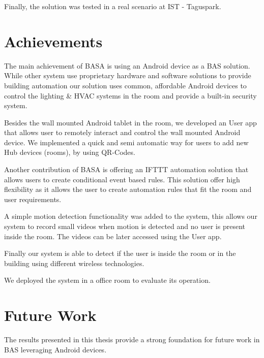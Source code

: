 Finally, the solution was tested in a real scenario  at \ac{IST} - Taguspark.


\section{Achievements}
\label{section:achievements}

The main achievement of BASA is using an Android device as a \ac{BAS} solution. While other system use proprietary hardware and software solutions to provide building automation our solution uses common, affordable Android devices to control the lighting \& \ac{HVAC} systems in the room and provide a built-in security system. 

Besides the wall mounted Android tablet in the room, we developed an User app that allows user to remotely interact and control the wall mounted Android device. We implemented a quick and semi automatic way for users to add new Hub devices (rooms), by using QR-Codes.


Another contribution of BASA is offering an \ac{IFTTT} automation solution that allows users to create conditional event based rules. This solution offer high flexibility as it allows the user to create automation rules that fit the room and user requirements.

A simple motion detection functionality was added to the system, this allows our system to record small videos when motion is detected and no user is present inside the room. The videos can be later accessed using the User app.

Finally our system is able to detect if the user is inside the room or in the building using different wireless technologies.


We deployed the system in a office room to evaluate its operation. 






\section{Future Work}
\label{section:future}

The results presented in this thesis provide a strong foundation for future work in \ac{BAS} leveraging Android devices. 

